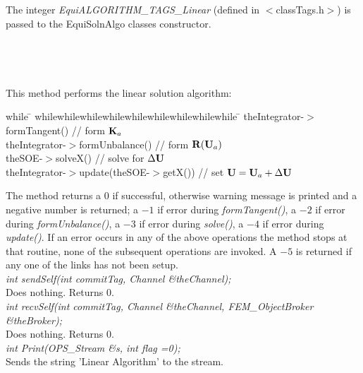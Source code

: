  \\ 
\\ 
The integer {\em EquiALGORITHM\_TAGS\_Linear} (defined in
$<$classTags.h$>$) is passed to the EquiSolnAlgo classes
constructor. \\

 \\
\\ 

  \\
 \\
This method performs the linear solution algorithm:
\begin{tabbing}
while \= \+ whilewhilewhilewhilewhilewhilewhilewhilewhile \= \kill
theIntegrator-$>$formTangent() \+ // form ${\bf K}_{a}$ \- \\
theIntegrator-$>$formUnbalance() // form ${\bf R}({\bf U}_{a})$ \\
theSOE-$>$solveX() // solve for $\Delta {\bf U}$ \\
theIntegrator-$>$update(theSOE-$>$getX()) // set ${\bf U} = {\bf U}_{a} + \Delta {\bf U}$ \-  
\end{tabbing}

The method returns a 0 if successful, otherwise warning message is
printed and a negative number is returned; a $-1$ if error during {\em
formTangent()}, a $-2$ if error during {\em formUnbalance()}, a $-3$
if error during {\em solve()}, a $-4$ if error during {\em
update()}. If an error occurs in any of the above operations the
method stops at that routine, none of the subsequent operations are
invoked. A $-5$ is returned if any one of the links has not been
setup. \\


{\em int sendSelf(int commitTag, Channel \&theChannel);}\\
Does  nothing. Returns 0. \\


{\em int recvSelf(int commitTag, Channel \&theChannel, FEM\_ObjectBroker
\&theBroker);}\\ 
Does nothing. Returns 0. \\

{\em int Print(OPS_Stream \&s, int flag =0);} \\
Sends the string 'Linear Algorithm' to the stream.